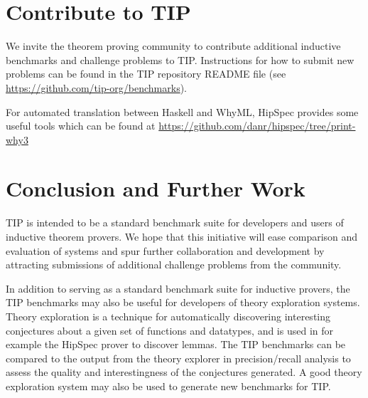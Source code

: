 \documentclass{llncs}
\begin{document}
%
%
%
%

\section{Contribute to TIP}
We invite the theorem proving community to contribute additional inductive benchmarks and challenge problems to TIP. Instructions for how to submit new problems can be found in the TIP repository README file (see \url{https://github.com/tip-org/benchmarks}).

For automated translation between Haskell and WhyML, HipSpec provides some useful tools which can be found at \url{https://github.com/danr/hipspec/tree/print-why3}



\section{Conclusion and Further Work}
TIP is intended to be a standard benchmark suite for developers and users of inductive theorem provers. We hope that this initiative will ease comparison and evaluation of systems and spur further collaboration and development by attracting submissions of additional challenge problems from the community. 

In addition to serving as a standard benchmark suite for inductive provers, the TIP benchmarks may also be useful for developers of theory exploration systems. Theory exploration is a technique for automatically discovering interesting conjectures about a given set of functions and datatypes, and is used in for example the HipSpec prover to discover lemmas. The TIP benchmarks can be compared to the output from the theory explorer in precision/recall analysis to assess the quality and interestingness of the conjectures generated. A good theory exploration system may also be used to generate new benchmarks for TIP.
\end{document}
